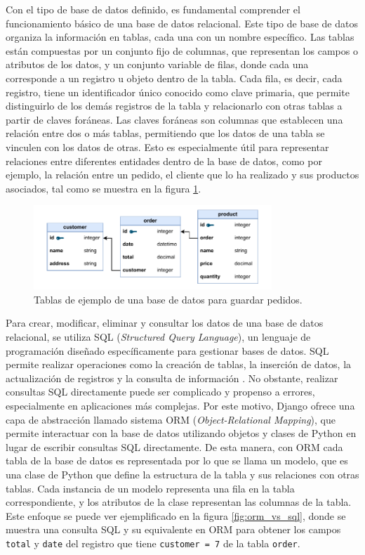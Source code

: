 Con el tipo de base de datos definido, es fundamental comprender el funcionamiento básico de una base de datos relacional. Este tipo de base de datos organiza la información en tablas, cada una con un nombre específico. Las tablas están compuestas por un conjunto fijo de columnas, que representan los campos o atributos de los datos, y un conjunto variable de filas, donde cada una corresponde a un registro u objeto dentro de la tabla. Cada fila, es decir, cada registro, tiene un identificador único conocido como clave primaria, que permite distinguirlo de los demás registros de la tabla y relacionarlo con otras tablas a partir de claves foráneas. Las claves foráneas son columnas que establecen una relación entre dos o más tablas, permitiendo que los datos de una tabla se vinculen con los datos de otras. Esto es especialmente útil para representar relaciones entre diferentes entidades dentro de la base de datos, como por ejemplo, la relación entre un pedido, el cliente que lo ha realizado y sus productos asociados, tal como se muestra en la figura \ref{fig:rel_db}.

\begin{figure}
    \centering
    \includegraphics[width=0.8\textwidth]{figures/theoric_frame/rel_db.pdf}
    \caption{Tablas de ejemplo de una base de datos para guardar pedidos.}
    \label{fig:rel_db}
\end{figure}

Para crear, modificar, eliminar y consultar los datos de una base de datos relacional, se utiliza SQL (\textit{Structured Query Language}), un lenguaje de programación diseñado específicamente para gestionar bases de datos. SQL permite realizar operaciones como la creación de tablas, la inserción de datos, la actualización de registros y la consulta de información \cite{aws_sql}. No obstante, realizar consultas SQL directamente puede ser complicado y propenso a errores, especialmente en aplicaciones más complejas. Por este motivo, Django ofrece una capa de abstracción llamado sistema ORM (\textit{Object-Relational Mapping}), que permite interactuar con la base de datos utilizando objetos y clases de Python en lugar de escribir consultas SQL directamente. De esta manera, con ORM cada tabla de la base de datos es representada por lo que se llama un modelo, que es una clase de Python que define la estructura de la tabla y sus relaciones con otras tablas. Cada instancia de un modelo representa una fila en la tabla correspondiente, y los atributos de la clase representan las columnas de la tabla. Este enfoque se puede ver ejemplificado en la figura \ref{fig:orm_vs_sql}, donde se muestra una consulta SQL y su equivalente en ORM para obtener los campos \texttt{total} y \texttt{date} del registro que tiene \texttt{customer = 7} de la tabla \texttt{order}.


